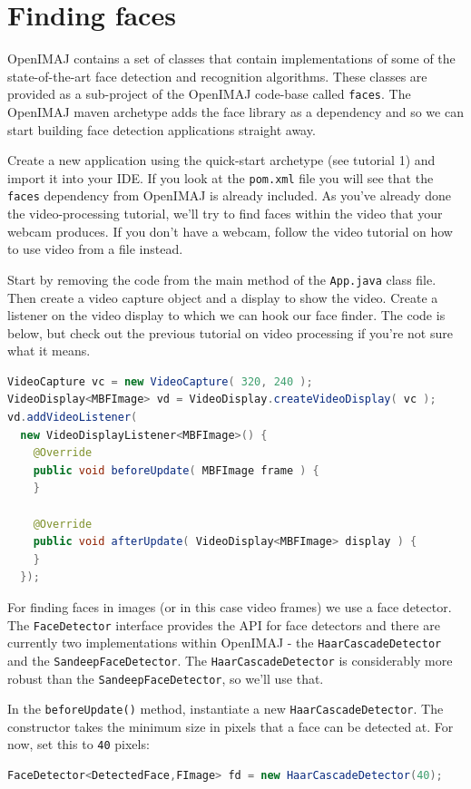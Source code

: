 \chapter{Finding faces}
OpenIMAJ contains a set of classes that contain implementations of some of the state-of-the-art face 
detection and recognition algorithms. These classes are provided as a sub-project of the OpenIMAJ 
code-base called \verb+faces+. The OpenIMAJ maven archetype adds the face library as a dependency and 
so we can start building face detection applications straight away.

Create a new application using the quick-start archetype (see tutorial 1) and import it into your IDE. 
If you look at the \verb+pom.xml+ file you will see that the \verb+faces+ dependency from OpenIMAJ is 
already included. As you've already done the video-processing tutorial, we'll try to find faces within 
the video that your webcam produces. If you don't have a webcam, follow the video tutorial on how to 
use video from a file instead.

Start by removing the code from the main method of the \verb+App.java+ class file. Then create a video 
capture object and a display to show the video. Create a listener on the video display to which we can 
hook our face finder. The code is below, but check out the previous tutorial on video processing if 
you're not sure what it means.
\begin{lstlisting}[language=java]
VideoCapture vc = new VideoCapture( 320, 240 );
VideoDisplay<MBFImage> vd = VideoDisplay.createVideoDisplay( vc );
vd.addVideoListener( 
  new VideoDisplayListener<MBFImage>() {
    @Override
    public void beforeUpdate( MBFImage frame ) {
    }

    @Override
    public void afterUpdate( VideoDisplay<MBFImage> display ) {
    }
  });
\end{lstlisting}
For finding faces in images (or in this case video frames) we use a face detector. The \verb+FaceDetector+ 
interface provides the API for face detectors and there are currently two implementations within OpenIMAJ - 
the \verb+HaarCascadeDetector+ and the \verb+SandeepFaceDetector+. The \verb+HaarCascadeDetector+
is considerably more robust than the \verb+SandeepFaceDetector+, so we'll use that.

In the \verb+beforeUpdate()+ method, instantiate a new \verb+HaarCascadeDetector+. The constructor takes 
the minimum size in pixels that a face can be detected at. For now, set this to \verb+40+ pixels:
\begin{lstlisting}[language=java]
FaceDetector<DetectedFace,FImage> fd = new HaarCascadeDetector(40);
\end{lstlisting}

